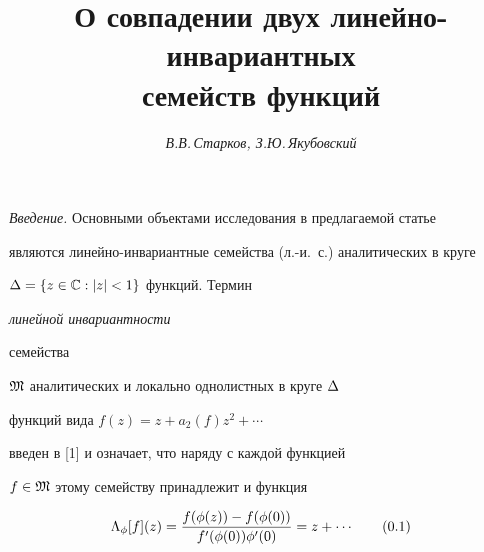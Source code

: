










\author{\it В.В.\,Старков, З.Ю.\,Якубовский}




\title{О совпадении двух линейно-инвариантных\\ семейств функций}





\date{}




\pagestyle{plain} %







\maketitle


\label{begin}











{\it Введение.} Основными объектами исследования в предлагаемой статье


являются линейно-инвариантные семейства (л.-и.~с.) аналитических в круге


$\Delta=\{z\in\Bbb C: |z|<1\}$ функций. Термин {\it линейной инвариантности


семейства} $\frak M$ аналитических и локально однолистных в круге $\Delta$


функций вида $f(z) = z+a_2(f)z^2+\dotsb$


введен в [1] и означает, что наряду с каждой функцией


$f \in \frak M$ этому семейству принадлежит и функция


\begin{equation}


\Lambda_{\phi}[f](z) =


\frac{f(\phi(z))-f(\phi(0))}{f'(\phi(0))\phi'(0)}=z+\cd \tag{0.1}


\end{equation}


